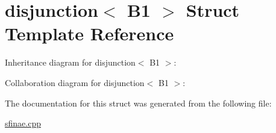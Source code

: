 \hypertarget{structdisjunction_3_01B1_01_4}{}\section{disjunction$<$ B1 $>$ Struct Template Reference}
\label{structdisjunction_3_01B1_01_4}


Inheritance diagram for disjunction$<$ B1 $>$\+:


Collaboration diagram for disjunction$<$ B1 $>$\+:


The documentation for this struct was generated from the following file\+:\begin{DoxyCompactItemize}
\item 
\hyperlink{sfinae_8cpp}{sfinae.\+cpp}\end{DoxyCompactItemize}
